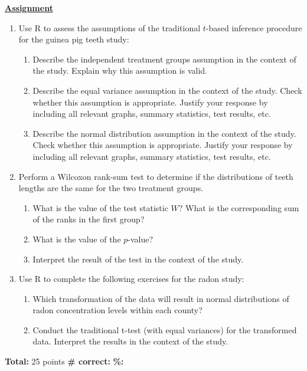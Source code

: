 \documentclass[11pt]{article}
\begin{document}
\newpage
\textbf{\underline{Assignment}}
\begin{enumerate}
\item Use R to assess the assumptions of the traditional $t$-based inference procedure for the guinea pig teeth study:
	\begin{enumerate}
	\item Describe the independent treatment groups assumption in the context of the study. Explain why this assumption is valid.
	\item Describe the equal variance assumption in the context of the study. Check whether this assumption is appropriate. Justify your response by including all relevant graphs, summary statistics, test results, etc. 
	\item Describe the normal distribution assumption in the context of the study. Check whether this assumption is appropriate. Justify your response by including all relevant graphs, summary statistics, test results, etc.
	\end{enumerate}

\item Perform a Wilcoxon rank-sum test to determine if the distributions of teeth lengths are the same for the two treatment groups. 
	\begin{enumerate}
		\item What is the value of the test statistic $W$? What is the corresponding sum of the ranks in the first group?
		\item What is the value of the $p$-value? 
		\item Interpret the result of the test in the context of the study.
	\end{enumerate}

\item Use R to complete the following exercises for the radon study:
	\begin{enumerate}
	\item Which transformation of the data will result in normal distributions of radon concentration levels within each county?
	\item Conduct the traditional t-test (with equal variances) for the transformed data. Interpret the results in the context of the study.
	\end{enumerate}
	
\end{enumerate}

\vfill
\textbf{Total:} 25 points \hspace{14pt} \textbf{\# correct:} \underline{\hspace{1in}}  \hspace{14pt} \textbf{\%:} \underline{\hspace{1in}} 
\end{document}
